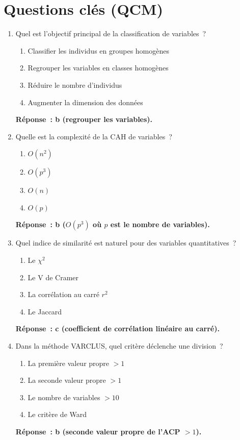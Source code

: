 \documentclass[a4paper,11pt]{article}
\theoremstyle{definition}
\theoremstyle{remark}
\begin{document}
\section*{Questions cl\'es (QCM)}


\begin{enumerate}

  \item Quel est l'objectif principal de la classification de
    variables~?
    \begin{enumerate}
      \item Classifier les individus en groupes homog\`enes
      \item Regrouper les variables en classes homog\`enes
      \item R\'eduire le nombre d'individus
      \item Augmenter la dimension des donn\'ees
    \end{enumerate}
    \textbf{R\'eponse~: b (regrouper les variables).}

  \item Quelle est la complexit\'e de la CAH de variables~?
    \begin{enumerate}
      \item $O(n^2)$
      \item $O(p^3)$
      \item $O(n)$
      \item $O(p)$
    \end{enumerate}
    \textbf{R\'eponse~: b ($O(p^3)$ o\`u $p$ est le nombre de
    variables).}

  \item Quel indice de similarit\'e est naturel pour des variables
    quantitatives~?
    \begin{enumerate}
      \item Le $\chi^2$
      \item Le V de Cramer
      \item La corr\'elation au carr\'e $r^2$
      \item Le Jaccard
    \end{enumerate}
    \textbf{R\'eponse~: c (coefficient de corr\'elation lin\'eaire
    au carr\'e).}

  \item Dans la m\'ethode VARCLUS, quel crit\`ere d\'eclenche une
    division~?
    \begin{enumerate}
      \item La premi\`ere valeur propre $> 1$
      \item La seconde valeur propre $> 1$
      \item Le nombre de variables $> 10$
      \item Le crit\`ere de Ward
    \end{enumerate}
    \textbf{R\'eponse~: b (seconde valeur propre de l'ACP $> 1$).}


\end{enumerate}
\end{document}
